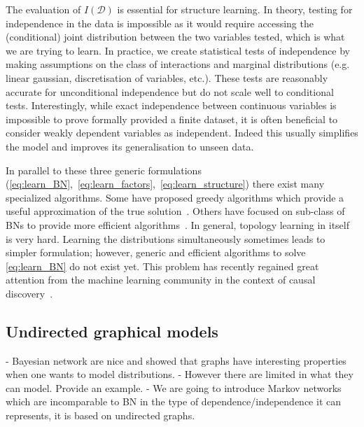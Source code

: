 The evaluation of $I(\mathcal{D})$ is essential for structure learning. In theory, testing for independence in the data is impossible as it would require accessing the (conditional) joint distribution between the two variables tested, which is what we are trying to learn. In practice, we create statistical tests of independence by making assumptions on the class of interactions and marginal distributions (e.g. linear gaussian, discretisation of variables, etc.). These tests are reasonably accurate for unconditional independence but do not scale well to conditional tests. Interestingly, while exact independence between continuous variables is impossible to prove formally provided a finite dataset, it is often beneficial to consider weakly dependent variables as independent. Indeed this usually simplifies the model and improves its generalisation to unseen data.

In parallel to these three generic formulations (\ref{eq:learn_BN},~\ref{eq:learn_factors},~\ref{eq:learn_structure}) there exist many specialized algorithms. Some have proposed greedy algorithms which provide a useful approximation of the true solution~\citep{}. Others have focused on sub-class of BNs to provide more efficient algorithms~\citep{}. In general, topology learning in itself is very hard. Learning the distributions simultaneously sometimes leads to simpler formulation; however, generic and efficient algorithms to solve \eqref{eq:learn_BN} do not exist yet. This problem has recently regained great attention from the machine learning community in the context of causal discovery~\citep{}.


%
%
\subsection{Undirected graphical models}
- Bayesian network are nice and showed that graphs have interesting properties when one wants to model distributions.
- However there are limited in what they can model. Provide an example.
- We are going to introduce Markov networks which are incomparable to BN in the type of dependence/independence it can represents, it is based on undirected graphs.
